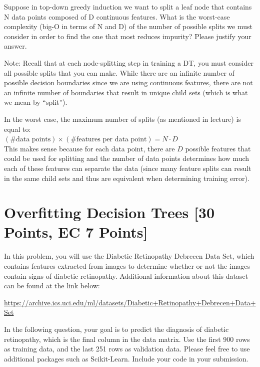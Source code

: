 \problem[4] Suppose in top-down greedy induction we want to split a leaf node that contains N data points composed of
D continuous features. What is the worst-case
complexity (big-O in terms of N and D) of the number of possible splits we must consider in order to find the one that most reduces impurity? Please justify your answer.

Note: Recall that at each node-splitting step in training a DT, you must consider all possible splits that you can make. While there are an infinite number of possible decision boundaries since we are using continuous features, there are not an infinite number of boundaries that result in unique child sets (which is what we mean by ``split'').

\begin{solution}
   In the worst case, the maximum number of splits (as mentioned in lecture) is equal to: \\
   $(\text{\# data points}) \times (\text{\# features per data point}) = N \cdot D$ \\
   This makes sense because for each data point, there are $D$ possible features that could be used for splitting and the number of data points determines how much each of these features can separate the data (since many feature splits can result in the same child sets and thus are equivalent when determining training error).
\end{solution}


\newpage

\section{Overfitting Decision Trees [30 Points, EC 7 Points]}

In this problem, you will use the Diabetic Retinopathy Debrecen Data Set, which contains features extracted from images to determine whether or not the images contain signs of diabetic retinopathy. Additional information about this dataset can be found at the link below:

\url{https://archive.ics.uci.edu/ml/datasets/Diabetic+Retinopathy+Debrecen+Data+Set}

In the following question, your goal is to predict the diagnosis of diabetic retinopathy, which is the final column in the data matrix.  Use the first 900 rows as training data, and the last
251 rows as validation data. Please feel free to use additional packages such as Scikit-Learn. Include your code in your submission.



